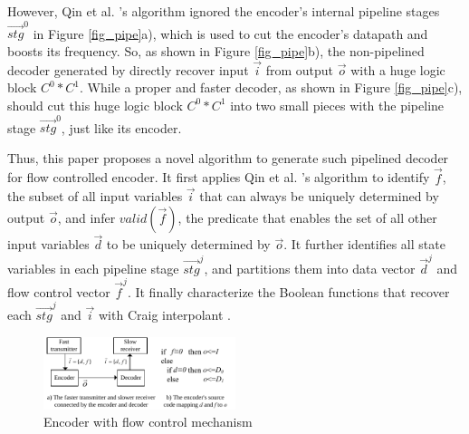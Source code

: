 \documentclass[conference]{IEEEtran}
\begin{document}
However,
Qin et al. \cite{QinTODAES15}'s algorithm ignored the encoder's 
internal pipeline stages $\vec{stg}^0$ in Figure \ref{fig_pipe}a),
which is used to cut the encoder's datapath and boosts its frequency.
So,
as shown in Figure \ref{fig_pipe}b),
the non-pipelined decoder generated by \cite{QinTODAES15} 
directly recover input $\vec{i}$ from output $\vec{o}$ with a huge logic block $C^0*C^1$.
While a proper and faster decoder,
as shown in Figure \ref{fig_pipe}c),
should cut this huge logic block $C^0*C^1$ into two small pieces with the pipeline stage $\vec{stg}^0$,
just like its encoder.






Thus,
this paper proposes a novel algorithm to generate such pipelined decoder for flow controlled encoder.
It first applies Qin et al. \cite{QinTODAES15}'s algorithm 
to identify $\vec{f}$,
the subset of all input variables $\vec{i}$ that can always be uniquely determined by output $\vec{o}$,
and infer $valid(\vec{f})$,
the predicate that enables the set of all other input variables $\vec{d}$ to be uniquely determined by $\vec{o}$.
It further identifies all state variables in each pipeline stage $\vec{stg}^j$,
and partitions them into data vector $\vec{d}^j$ and flow control vector $\vec{f}^j$.
It finally characterize the Boolean functions that recover each $\vec{stg}^j$ and $\vec{i}$ with 
Craig interpolant \cite{InterpBoolFunction}.

\begin{figure}[t]
\centering
\includegraphics[width=0.5\textwidth]{nonuniq}
\caption{Encoder with flow control mechanism}
\label{fig_fc}
\end{figure}
\end{document}
